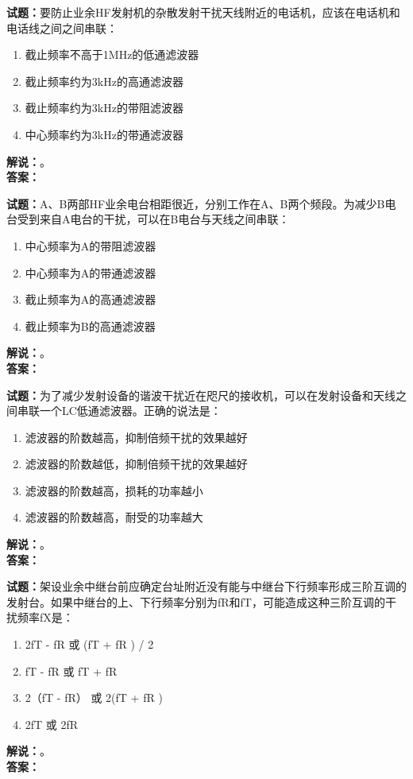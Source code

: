 \documentclass{ctexbook}
\begin{document}
\bigskip

\noindent\textbf{试题：}要防止业余HF发射机的杂散发射干扰天线附近的电话机，应该在电话机和电话线之间之间串联：
\begin{enumerate}[leftmargin=3em]
  \item 截止频率不高于1\unit{\MHz}的低通滤波器
  \item 截止频率约为3\unit{\kHz}的高通滤波器
  \item 截止频率约为3\unit{\kHz}的带阻滤波器
  \item 中心频率约为3\unit{\kHz}的带通滤波器
\end{enumerate}
\noindent\textbf{解说：}\textbf{}。\\\noindent\textbf{答案：}

\bigskip

\noindent\textbf{试题：}A、B两部HF业余电台相距很近，分别工作在A、B两个频段。为减少B电台受到来自A电台的干扰，可以在B电台与天线之间串联：
\begin{enumerate}[leftmargin=3em]
  \item 中心频率为A的带阻滤波器
  \item 中心频率为A的带通滤波器
  \item 截止频率为A的高通滤波器
  \item 截止频率为B的高通滤波器
\end{enumerate}
\noindent\textbf{解说：}\textbf{}。\\\noindent\textbf{答案：}

\bigskip

\noindent\textbf{试题：}为了减少发射设备的谐波干扰近在咫尺的接收机，可以在发射设备和天线之间串联一个LC低通滤波器。正确的说法是：
\begin{enumerate}[leftmargin=3em]
  \item 滤波器的阶数越高，抑制倍频干扰的效果越好
  \item 滤波器的阶数越低，抑制倍频干扰的效果越好
  \item 滤波器的阶数越高，损耗的功率越小
  \item 滤波器的阶数越高，耐受的功率越大
\end{enumerate}
\noindent\textbf{解说：}\textbf{}。\\\noindent\textbf{答案：}

\bigskip

\noindent\textbf{试题：}架设业余中继台前应确定台址附近没有能与中继台下行频率形成三阶互调的发射台。如果中继台的上、下行频率分别为fR和fT，可能造成这种三阶互调的干扰频率fX是：
\begin{enumerate}[leftmargin=3em]
  \item 2fT - fR 或 (fT + fR ) / 2
  \item fT - fR 或 fT + fR
  \item 2（fT - fR） 或 2(fT + fR )
  \item 2fT 或 2fR
\end{enumerate}
\noindent\textbf{解说：}\textbf{}。\\\noindent\textbf{答案：}
\end{document}
